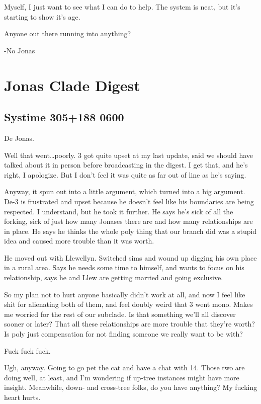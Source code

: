 Myself, I just want to see what I can do to help. The system is neat, but it's starting to show it's age.

Anyone out there running into anything?

-No Jonas

\newpage
\hypertarget{jonas-clade-digest-2}{%
\section*{Jonas Clade Digest}\label{jonas-clade-digest-2}}

\hypertarget{systime-305188-0600}{%
\subsection*{Systime 305+188 0600}\label{systime-305188-0600}}

De Jonas.

Well that went\ldots{}poorly. 3 got quite upset at my last update, said we should have talked about it in person before broadcasting in the digest. I get that, and he's right, I apologize. But I don't feel it was quite as far out of line as he's saying.

Anyway, it spun out into a little argument, which turned into a big argument. De-3 is frustrated and upset because he doesn't feel like his boundaries are being respected. I understand, but he took it further. He says he's sick of all the forking, sick of just how many Jonases there are and how many relationships are in place. He says he thinks the whole poly thing that our branch did was a stupid idea and caused more trouble than it was worth.

He moved out with Llewellyn. Switched sims and wound up digging his own place in a rural area. Says he needs some time to himself, and wants to focus on his relationship, says he and Llew are getting married and going exclusive.

So my plan not to hurt anyone basically didn't work at all, and now I feel like shit for alienating both of them, and feel doubly weird that 3 went mono. Makes me worried for the rest of our subclade. Is that something we'll all discover sooner or later? That all these relationships are more trouble that they're worth? Is poly just compensation for not finding someone we really want to be with?

Fuck fuck fuck.

Ugh, anyway. Going to go pet the cat and have a chat with 14. Those two are doing well, at least, and I'm wondering if up-tree instances might have more insight. Meanwhile, down- and cross-tree folks, do you have anything? My fucking heart hurts.

